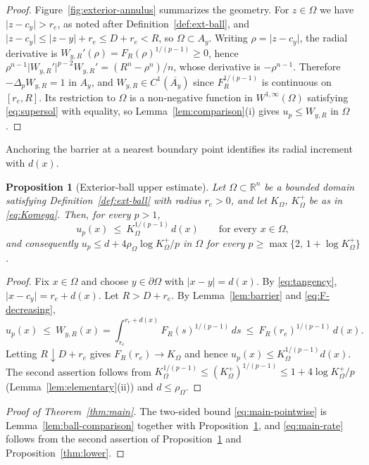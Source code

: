 \documentclass[11pt]{article}
\newcommand{\R}{\mathbb R}
\newcommand{\abs}[1]{\lvert #1\rvert}
\newtheorem{proposition}[theorem]{Proposition}
\theoremstyle{definition}
\theoremstyle{remark}
\begin{document}
\begin{proof}
Figure~\ref{fig:exterior-annulus} summarizes the geometry. For $z\in\Omega$ we
have $\abs{z-c_y}>r_e$, as noted after Definition~\ref{def:ext-ball}, and
$\abs{z-c_y}\le\abs{z-y}+r_e\le D+r_e<R$, so $\Omega\subset A_y$. Writing
$\rho=\abs{z-c_y}$, the radial derivative is
$W_{y,R}'(\rho)=F_R(\rho)^{1/(p-1)}\ge0$, hence
$\rho^{n-1}\abs{W_{y,R}'}^{p-2}W_{y,R}'=(R^n-\rho^n)/n$, whose derivative is
$-\rho^{n-1}$. Therefore $-\Delta_pW_{y,R}=1$ in $A_y$, and
$W_{y,R}\in C^1(\overline{A_y})$ since $F_R^{1/(p-1)}$ is continuous on
$[r_e,R]$. Its restriction to $\Omega$ is a non-negative function in
$W^{1,\infty}(\Omega)$ satisfying \eqref{eq:supersol} with equality, so
Lemma~\ref{lem:comparison}(i) gives $u_p\le W_{y,R}$ in $\Omega$.
\end{proof}

Anchoring the barrier at a nearest boundary point identifies its radial
increment with $d(x)$.
\begin{proposition}[Exterior-ball upper estimate]\label{thm:upper}
Let $\Omega\subset\R^n$ be a bounded domain satisfying
Definition~\ref{def:ext-ball} with radius $r_e>0$, and let $K_\Omega$,
$K_\Omega^+$ be as in \eqref{eq:Komega}. Then, for every $p>1$,
\[
u_p(x)\ \le\ K_\Omega^{1/(p-1)}\,d(x)
\qquad\text{for every }x\in\Omega,
\]
and consequently
$u_p\le d+4\rho_\Omega\log K_\Omega^+/p$ in $\Omega$ for every
$p\ge\max\{2,\,1+\log K_\Omega^+\}$.
\end{proposition}
\begin{proof}
Fix $x\in\Omega$ and choose $y\in\partial\Omega$ with $\abs{x-y}=d(x)$. By
\eqref{eq:tangency}, $\abs{x-c_y}=r_e+d(x)$. Let $R>D+r_e$. By
Lemma~\ref{lem:barrier} and \eqref{eq:F-decreasing},
\[
u_p(x)\ \le\ W_{y,R}(x)
=\int_{r_e}^{r_e+d(x)}F_R(s)^{1/(p-1)}\,ds
\ \le\ F_R(r_e)^{1/(p-1)}\,d(x).
\]
Letting $R\downarrow D+r_e$ gives $F_R(r_e)\to K_\Omega$ and hence
$u_p(x)\le K_\Omega^{1/(p-1)}d(x)$. The second assertion follows from
$K_\Omega^{1/(p-1)}\le (K_\Omega^+)^{1/(p-1)}\le1+4\log K_\Omega^+/p$
(Lemma~\ref{lem:elementary}(ii)) and $d\le\rho_\Omega$.
\end{proof}

\begin{proof}[Proof of Theorem~\ref{thm:main}]
The two-sided bound \eqref{eq:main-pointwise} is
Lemma~\ref{lem:ball-comparison} together with Proposition~\ref{thm:upper},
and \eqref{eq:main-rate} follows from the second assertion of
Proposition~\ref{thm:upper} and Proposition~\ref{thm:lower}.
\end{proof}
\end{document}

